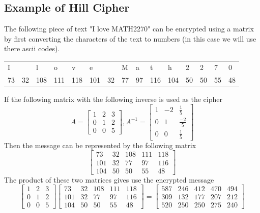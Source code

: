 \documentclass{../mathhomework}
\begin{document}
\subsection{Example of Hill Cipher}


The following piece of text "I love MATH2270" can be encrypted using a matrix by first converting the characters
of the text to numbers (in this case we will use there ascii codes).
\begin{table}[H]
    \begin{tabular}{lllllllllllllll}
    I  &    & l   & o   & v   & e   &    & M  & a  & t   & h   & 2  & 2  & 7  & 0  \\
    73 & 32 & 108 & 111 & 118 & 101 & 32 & 77 & 97 & 116 & 104 & 50 & 50 & 55 & 48
    \end{tabular}
\end{table}
\noindent If the following matrix with the following inverse is used as the cipher
\begin{equation*}
    A = \begin{bmatrix}
        1 & 2 & 3 \\
        0 & 1 & 2 \\
        0 & 0 & 5
    \end{bmatrix},
    A^{-1} = \begin{bmatrix}
        1 & -2 & \frac{1}{5} \\ 
        0 & 1 & \frac{-2}{5} \\
        0 & 0 & \frac{1}{5}
    \end{bmatrix}
\end{equation*}
Then the message can be represented by the following matrix
\begin{equation*}
    \begin{bmatrix}
        73 & 32 & 108 & 111 & 118 \\ 
        101 & 32 & 77 & 97 & 116 \\ 
        104 & 50 & 50 & 55 & 48
    \end{bmatrix}
\end{equation*}
The product of these two matrices gives use the encrypted message
\begin{equation*}
    \begin{bmatrix}
        1 & 2 & 3 \\
        0 & 1 & 2 \\
        0 & 0 & 5
    \end{bmatrix}
    \begin{bmatrix}
        73 & 32 & 108 & 111 & 118 \\ 
        101 & 32 & 77 & 97 & 116 \\ 
        104 & 50 & 50 & 55 & 48
    \end{bmatrix} = \begin{bmatrix}
        587 & 246 & 412 & 470 & 494 \\
        309 & 132 & 177 & 207 & 212 \\
        520 & 250 & 250 & 275 & 240
    \end{bmatrix}
\end{equation*}
\end{document}
